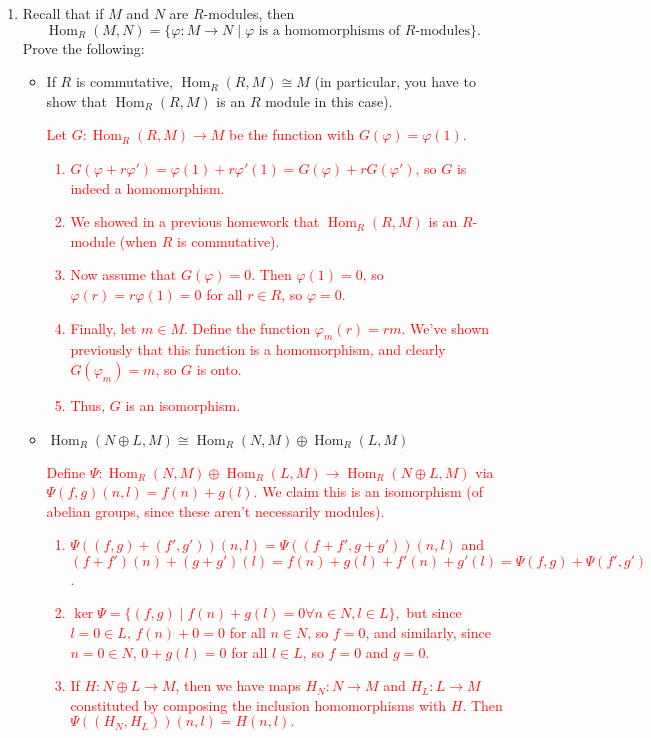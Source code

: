 \documentclass[12pt]{article}
\newcommand{\Hom}{\operatorname{Hom}}
\newcommand{\solution}[1]{\textcolor{red}{#1}}
\begin{document}
\begin{enumerate}
\item Recall that if $M$ and $N$ are $R$-modules, then \[\Hom_R(M,N) =
  \{\varphi: M\rightarrow N \mid \varphi \textrm{ is a homomorphisms
    of $R$-modules}\}.\] Prove the following:
\begin{itemize}
\item If $R$ is commutative, $\Hom_R(R, M) \cong M$ (in particular, you have to show that
  $\Hom_R(R,M)$ is an $R$ module in this case). 
\solution{
Let $G: \Hom_R(R,M)\rightarrow M$ be the function with $G(\varphi) =
\varphi(1)$.
\begin{enumerate}
\item $G(\varphi+r\varphi') = \varphi(1)+r\varphi'(1) =
  G(\varphi)+rG(\varphi')$, so $G$ is indeed a homomorphism.
\item We showed in a previous homework that $\Hom_R(R,M)$ is an
  $R$-module (when $R$ is commutative). 
\item Now assume that $G(\varphi)=0$. Then $\varphi(1)=0$, so
  $\varphi(r) = r\varphi(1) = 0$ for all $r\in R$, so $\varphi=0$.
\item Finally, let $m\in M$. Define the function $\varphi_m(r) =
  rm$. We've shown previously that this function is a homomorphism,
  and clearly $G(\varphi_m) = m$, so $G$ is onto. 
\item Thus, $G$ is an isomorphism. 
\end{enumerate}
}
\item $\Hom_R(N\oplus L, M) \cong \Hom_R(N,M)\oplus \Hom_R(L,M)$
\solution{
  Define $\Psi: \Hom_R(N,M) \oplus \Hom_R(L,M) \rightarrow
  \Hom_R(N\oplus L, M)$ via $\Psi(f,g) (n,l) = f(n)+g(l)$. We
  claim this is an isomorphism (of abelian groups, since these aren't
  necessarily modules).
  \begin{enumerate}
  \item $\Psi( (f,g)+(f',g'))(n,l)= \Psi((f+f',g+g'))(n,l)$ and
    $(f+f')(n)+(g+g')(l) = f(n)+g(l) + f'(n)+g'(l) =
    \Psi(f,g)+\Psi(f',g')$.
  \item $\ker\Psi=\{(f,g) \mid f(n)+g(l) = 0 \forall n\in N, l\in L\},$
    but since $l=0\in L$, $f(n)+0=0$ for all $n\in N$, so $f=0$, and
    similarly, since $n=0\in N$, $0+g(l)=0$ for all $l\in L$, so $f=0$
    and $g=0$. 
  \item If $H: N\oplus L \rightarrow M$, then we have maps $H_N:
    N\rightarrow M$ and $H_L: L\rightarrow M$ constituted by composing
    the inclusion homomorphisms with $H$. Then $\Psi((H_N, H_L))(n,l)
    = H(n,l).$
  \end{enumerate}
}
\end{itemize}
\end{enumerate}
\end{document}
